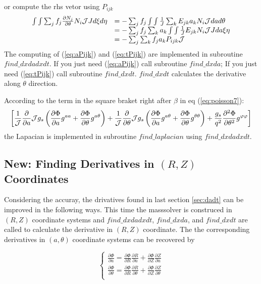 \documentclass{report}
\newcommand{\ff}[2]{\frac{#1}{#2}}
\newcommand{\pp}[2]{\frac{\partial{#1}}{\partial{#2}}}
\newcommand{\psp}[2]{\frac{\partial^2{#1}}{\partial{#2}^2}}
\begin{document}
or compute the rhs vetor using $P_{ijk}$
\begin{equation}
\label{eq:tPijk}
\begin{array}{ll}
\int\int \sum_j f_j \pp{N_j}{\theta} N_i {\cal J} J d\xi d\eta
& = - \sum_j f_j \int\int \ff{1}{J} \sum_k E_{jk} a_k N_i {\cal J} dad\theta
\\
& = - \sum_j f_j \sum_k a_k \int\int \ff{1}{J} E_{jk} N_i {\cal J} J da\xi \eta \\
& = - \sum_j \sum_k f_j a_k P_{ijk} {\cal J}
\end{array}
\end{equation}
The computing of (\ref{eq:aPijk}) and (\ref{eq:tPijk}) are implemented in subroutine $find\_dxdadxdt$.
If you just need (\ref{eq:aPijk}) call subroutine $find\_dxda$;
If you just need (\ref{eq:tPijk}) call subroutine $find\_dxdt$.
$find\_dxdt$ calculates the derivative along $\theta$ direction.

According to the term in the square braket right after $\beta$ in eq (\ref{eq:poisson7}):
$$
\left[
\ff{1}{\cal J} \pp{}{a} {\cal J} g_s \left( 
           \pp{\Phi}{a} g^{a a} + \pp{\Phi}{\theta} g^{a \theta}
                        \right)
+
\ff{1}{\cal J} \pp{}{\theta} {\cal J} g_s \left( 
           \pp{\Phi}{a} g^{a \theta} + \pp{\Phi}{\theta} g^{\theta \theta}
                        \right)
+
           \ff{g_s}{q^2} \psp{\Phi}{\theta} g^{\varphi \varphi}
                    \right] 
$$
the Lapacian is implemented in subroutine $find\_laplacian$ using $find\_dxdadxdt$.



\subsection{New: Finding Derivatives in $(R,Z)$ Coordinates}
\label{sec:dadt_new}
Considering the accuray, the drivatives found in last section \ref{sec:dadt} can be improved in the following ways.
This time the masssolver is construced in $(R,Z)$ coordinate systems and 
$find\_dxdadxdt$, $find\_dxda$, and $find\_dxdt$
are called to calculate the derivative in $(R,Z)$ coordinate. The the corresponding derivatives
in $(a,\theta)$ coordinate systems can be recovered by

\begin{equation}
\label{tranformation:at2rz}
   \left\{
   \begin{array}{l}
     \pp{\Phi}{a} = \pp{\Phi}{R}\pp{R}{a} + \pp{\Phi}{Z}\pp{Z}{a} \\
     \pp{\Phi}{\theta} = \pp{\Phi}{R}\pp{R}{\theta} + \pp{\Phi}{Z}\pp{Z}{\theta} \\
   \end{array}
   \right.
\end{equation}
\end{document}
